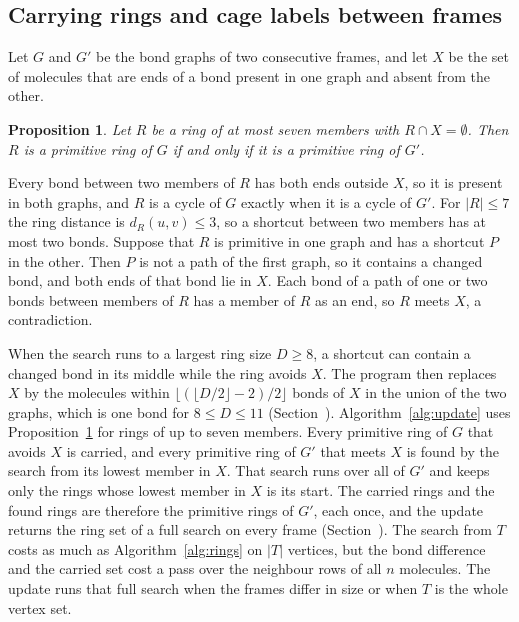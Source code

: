 \documentclass[preprint,12pt]{elsarticle}
\newtheorem{proposition}{Proposition}
\begin{document}
\subsection{Carrying rings and cage labels between frames}
\label{sec:update}

Let $G$ and $G'$ be the bond graphs of two consecutive frames, and let $X$ be the set of molecules that are ends of a bond present in one graph and absent from the other.

\begin{proposition}
\label{prop:local} Let $R$ be a ring of at most seven members with $R\cap X=\emptyset$.
Then $R$ is a primitive ring of $G$ if and only if it is a primitive ring of $G'$.
\end{proposition}

\begin{pf}
Every bond between two members of $R$ has both ends outside $X$, so it is present in both graphs, and $R$ is a cycle of $G$ exactly when it is a cycle of $G'$.
For $|R|\le 7$ the ring distance is $d_R(u,v)\le 3$, so a shortcut between two members has at most two bonds.
Suppose that $R$ is primitive in one graph and has a shortcut $P$ in the other.
Then $P$ is not a path of the first graph, so it contains a changed bond, and both ends of that bond lie in $X$.
Each bond of a path of one or two bonds between members of $R$ has a member of $R$ as an end, so $R$ meets $X$, a contradiction.
\end{pf}

When the search runs to a largest ring size $D\ge 8$, a shortcut can contain a changed bond in its middle while the ring avoids $X$.
The program then replaces $X$ by the molecules within $\lfloor(\lfloor D/2\rfloor-2)/2\rfloor$ bonds of $X$ in the union of the two graphs, which is one bond for $8\le D\le 11$ (Section~).
Algorithm~\ref{alg:update} uses Proposition~\ref{prop:local} for rings of up to seven members.
Every primitive ring of $G$ that avoids $X$ is carried, and every primitive ring of $G'$ that meets $X$ is found by the search from its lowest member in $X$.
That search runs over all of $G'$ and keeps only the rings whose lowest member in $X$ is its start.
The carried rings and the found rings are therefore the primitive rings of $G'$, each once, and the update returns the ring set of a full search on every frame (Section~).
The search from $T$ costs as much as Algorithm~\ref{alg:rings} on $|T|$ vertices, but the bond difference and the carried set cost a pass over the neighbour rows of all $n$ molecules.
The update runs that full search when the frames differ in size or when $T$ is the whole vertex set.
\end{document}
